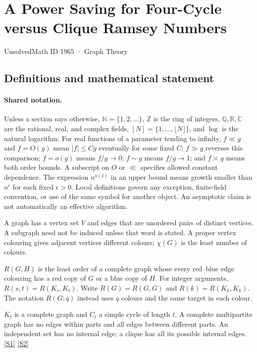 \documentclass[11pt,a4paper]{article}
\newcommand{\N}{\mathbb{N}}
\newcommand{\Z}{\mathbb{Z}}
\newcommand{\Q}{\mathbb{Q}}
\newcommand{\R}{\mathbb{R}}
\newcommand{\C}{\mathbb{C}}
\newcommand{\sref}[2]{\hyperlink{source:#1:#2}{[S#2]}}
\begin{document}

\setcounter{section}{1964}

\section{A Power Saving for Four-Cycle versus Clique Ramsey Numbers}\label{1965}

{\small\sffamily UnsolvedMath ID 1965 · Graph Theory}

\subsection{Definitions and mathematical statement}

\paragraph{Shared notation.}Unless a section says otherwise, $\N=\{1,2,\ldots\}$,
$\Z$ is the ring of integers, $\Q,\R,\C$ are the rational, real, and complex
fields, $[N]=\{1,\ldots,\lfloor N\rfloor\}$, and $\log$ is the natural
logarithm. For real functions of a parameter tending to infinity,
$f\ll g$ and $f=O(g)$ mean $|f|\leq Cg$ eventually for some fixed $C$;
$f\gg g$ reverses this comparison; $f=o(g)$ means $f/g\to0$;
$f\sim g$ means $f/g\to1$; and $f\asymp g$ means both order bounds.
A subscript on $O$ or $\ll$ specifies allowed constant dependence.
The expression $n^{o(1)}$ in an upper bound means growth smaller than
$n^\epsilon$ for each fixed $\epsilon>0$. Local definitions govern any
exception, finite-field convention, or use of the same symbol for another
object. An asymptotic claim is not automatically an effective algorithm.



A graph has a vertex set $V$ and edges that are unordered pairs of distinct vertices. A subgraph need not be induced unless that word is stated. A proper vertex colouring gives adjacent vertices different colours; $\chi(G)$ is the least number of colours.

$R(G,H)$ is the least order of a complete graph whose every red--blue edge colouring has a red copy of $G$ or a blue copy of $H$. For integer arguments, $R(s,t)=R(K_s,K_t)$. Write $R(G)=R(G,G)$ and $R(k)=R(K_k,K_k)$. The notation $R(G;q)$ instead uses $q$ colours and the same target in each colour.

$K_t$ is a complete graph and $C_t$ a simple cycle of length $t$. A complete multipartite graph has no edges within parts and all edges between different parts. An independent set has no internal edge; a clique has all its possible internal edges. \sref{1965}{1} \sref{1965}{2}
\end{document}
